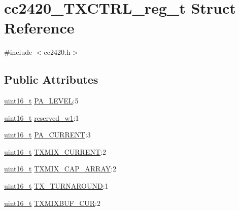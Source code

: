 \hypertarget{structcc2420___t_x_c_t_r_l__reg__t}{}\section{cc2420\+\_\+\+T\+X\+C\+T\+R\+L\+\_\+reg\+\_\+t Struct Reference}
\label{structcc2420___t_x_c_t_r_l__reg__t}


{\ttfamily \#include $<$cc2420.\+h$>$}

\subsection*{Public Attributes}
\begin{DoxyCompactItemize}
\item 
\hyperlink{_p_e___types_8h_a1f1825b69244eb3ad2c7165ddc99c956}{uint16\+\_\+t} \hyperlink{structcc2420___t_x_c_t_r_l__reg__t_af66d0b31aa1a14ca425e38690a1e3dc6}{P\+A\+\_\+\+L\+E\+V\+EL}\+:5
\item 
\hyperlink{_p_e___types_8h_a1f1825b69244eb3ad2c7165ddc99c956}{uint16\+\_\+t} \hyperlink{structcc2420___t_x_c_t_r_l__reg__t_aa832778efdb3dfc0ccaf7c43d8792461}{reserved\+\_\+w1}\+:1
\item 
\hyperlink{_p_e___types_8h_a1f1825b69244eb3ad2c7165ddc99c956}{uint16\+\_\+t} \hyperlink{structcc2420___t_x_c_t_r_l__reg__t_a277a37221bdf2b2c5b500426671d3bd1}{P\+A\+\_\+\+C\+U\+R\+R\+E\+NT}\+:3
\item 
\hyperlink{_p_e___types_8h_a1f1825b69244eb3ad2c7165ddc99c956}{uint16\+\_\+t} \hyperlink{structcc2420___t_x_c_t_r_l__reg__t_a571333a0ec256e9636d6a26e114837c3}{T\+X\+M\+I\+X\+\_\+\+C\+U\+R\+R\+E\+NT}\+:2
\item 
\hyperlink{_p_e___types_8h_a1f1825b69244eb3ad2c7165ddc99c956}{uint16\+\_\+t} \hyperlink{structcc2420___t_x_c_t_r_l__reg__t_a4e7027febd2562c5cea00c343ca41aba}{T\+X\+M\+I\+X\+\_\+\+C\+A\+P\+\_\+\+A\+R\+R\+AY}\+:2
\item 
\hyperlink{_p_e___types_8h_a1f1825b69244eb3ad2c7165ddc99c956}{uint16\+\_\+t} \hyperlink{structcc2420___t_x_c_t_r_l__reg__t_a22b1f2cc14f436f4a84eaba3549abc25}{T\+X\+\_\+\+T\+U\+R\+N\+A\+R\+O\+U\+ND}\+:1
\item 
\hyperlink{_p_e___types_8h_a1f1825b69244eb3ad2c7165ddc99c956}{uint16\+\_\+t} \hyperlink{structcc2420___t_x_c_t_r_l__reg__t_a797f907eb57c0f87f65be4db3dc01c1c}{T\+X\+M\+I\+X\+B\+U\+F\+\_\+\+C\+UR}\+:2
\end{DoxyCompactItemize}


